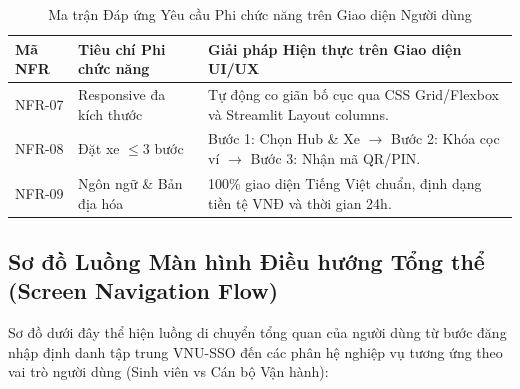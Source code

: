\documentclass[12pt,a4paper]{article}
\begin{document}
\begin{table}[H]
    \centering
    \renewcommand{\arraystretch}{1.25}
    \caption{Ma trận Đáp ứng Yêu cầu Phi chức năng trên Giao diện Người dùng}
    \label{tab:ui-nfr-matrix}
    \begin{tabularx}{\textwidth}{|l|l|X|}
        \hline
        \textbf{Mã NFR} & \textbf{Tiêu chí Phi chức năng} & \textbf{Giải pháp Hiện thực trên Giao diện UI/UX} \\
        \hline
        NFR-07 & Responsive đa kích thước & Tự động co giãn bố cục qua CSS Grid/Flexbox và Streamlit Layout columns. \\
        \hline
        NFR-08 & Đặt xe $\le 3$ bước & Bước 1: Chọn Hub \& Xe $\rightarrow$ Bước 2: Khóa cọc ví $\rightarrow$ Bước 3: Nhận mã QR/PIN. \\
        \hline
        NFR-09 & Ngôn ngữ \& Bản địa hóa & 100\% giao diện Tiếng Việt chuẩn, định dạng tiền tệ VNĐ và thời gian 24h. \\
        \hline
    \end{tabularx}
\end{table}



\clearpage
\subsection{Sơ đồ Luồng Màn hình Điều hướng Tổng thể (Screen Navigation Flow)}
Sơ đồ dưới đây thể hiện luồng di chuyển tổng quan của người dùng từ bước đăng nhập định danh tập trung VNU-SSO đến các phân hệ nghiệp vụ tương ứng theo vai trò người dùng (Sinh viên vs Cán bộ Vận hành):
\end{document}
